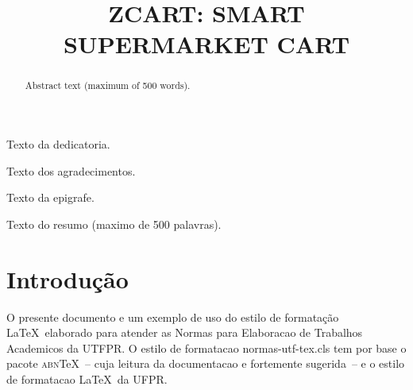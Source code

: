 \documentclass[openright]{normas-utf-tex} %
\title{\MakeUppercase{zCart: Smart Supermarket Cart}} %
\begin{document}
\capa %
\folhaderosto %

\begin{dedicatoria}
Texto da dedicatoria.
\end{dedicatoria}

\begin{agradecimentos}
Texto dos agradecimentos.
\end{agradecimentos}

\begin{epigrafe}
Texto da epigrafe.
\end{epigrafe}

\begin{resumo}
Texto do resumo (maximo de 500 palavras).
\end{resumo}

\begin{abstract}
Abstract text (maximum of 500 words).
\end{abstract}

\listadefiguras %
\listadetabelas %
\listadequadros %
\listadesiglas %
\listadesimbolos %

\sumario %


%
%
%
%

\setcounter{page}{12}

\chapter{Introdução}

O presente documento e um exemplo de uso do estilo de formatação \LaTeX\ elaborado para atender as Normas para Elaboracao de Trabalhos Academicos da UTFPR. O estilo de formatacao {\ttfamily normas-utf-tex.cls} tem por base o pacote \textsc{abn}\TeX~-- cuja leitura da documentacao \cite{abnTeX2009} e fortemente sugerida~-- e o estilo de formatacao \LaTeX\ da UFPR.
\end{document}

